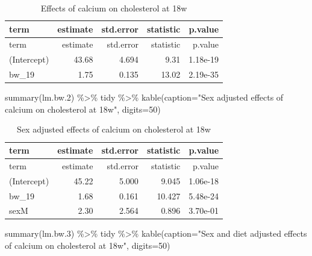 \documentclass[
]{article}
\newenvironment{Shaded}{\begin{snugshade}}{\end{snugshade}}
\newcommand{\AttributeTok}[1]{\textcolor[rgb]{0.77,0.63,0.00}{#1}}
\newcommand{\DecValTok}[1]{\textcolor[rgb]{0.00,0.00,0.81}{#1}}
\newcommand{\FloatTok}[1]{\textcolor[rgb]{0.00,0.00,0.81}{#1}}
\newcommand{\FunctionTok}[1]{\textcolor[rgb]{0.00,0.00,0.00}{#1}}
\newcommand{\NormalTok}[1]{#1}
\newcommand{\SpecialCharTok}[1]{\textcolor[rgb]{0.00,0.00,0.00}{#1}}
\newcommand{\StringTok}[1]{\textcolor[rgb]{0.31,0.60,0.02}{#1}}
\begin{document}
\begin{longtable}[]{@{}lrrrr@{}}
\caption{Effects of calcium on cholesterol at 18w}\tabularnewline
\toprule()
term & estimate & std.error & statistic & p.value \\
\midrule()
\endfirsthead
\toprule()
term & estimate & std.error & statistic & p.value \\
\midrule()
\endhead
(Intercept) & 43.68 & 4.694 & 9.31 & 1.18e-19 \\
bw\_19 & 1.75 & 0.135 & 13.02 & 2.19e-35 \\
\bottomrule()
\end{longtable}

\begin{Shaded}
\begin{Highlighting}[]
\FunctionTok{summary}\NormalTok{(lm.bw}\FloatTok{.2}\NormalTok{) }\SpecialCharTok{\%\textgreater{}\%}\NormalTok{ tidy }\SpecialCharTok{\%\textgreater{}\%} \FunctionTok{kable}\NormalTok{(}\AttributeTok{caption=}\StringTok{"Sex adjusted effects of calcium on cholesterol at 18w"}\NormalTok{, }\AttributeTok{digits=}\DecValTok{50}\NormalTok{)}
\end{Highlighting}
\end{Shaded}

\begin{longtable}[]{@{}lrrrr@{}}
\caption{Sex adjusted effects of calcium on cholesterol at
18w}\tabularnewline
\toprule()
term & estimate & std.error & statistic & p.value \\
\midrule()
\endfirsthead
\toprule()
term & estimate & std.error & statistic & p.value \\
\midrule()
\endhead
(Intercept) & 45.22 & 5.000 & 9.045 & 1.06e-18 \\
bw\_19 & 1.68 & 0.161 & 10.427 & 5.48e-24 \\
sexM & 2.30 & 2.564 & 0.896 & 3.70e-01 \\
\bottomrule()
\end{longtable}

\begin{Shaded}
\begin{Highlighting}[]
\FunctionTok{summary}\NormalTok{(lm.bw}\FloatTok{.3}\NormalTok{) }\SpecialCharTok{\%\textgreater{}\%}\NormalTok{ tidy }\SpecialCharTok{\%\textgreater{}\%} \FunctionTok{kable}\NormalTok{(}\AttributeTok{caption=}\StringTok{"Sex and diet adjusted effects of calcium on cholesterol at 18w"}\NormalTok{, }\AttributeTok{digits=}\DecValTok{50}\NormalTok{)}
\end{Highlighting}
\end{Shaded}
\end{document}
